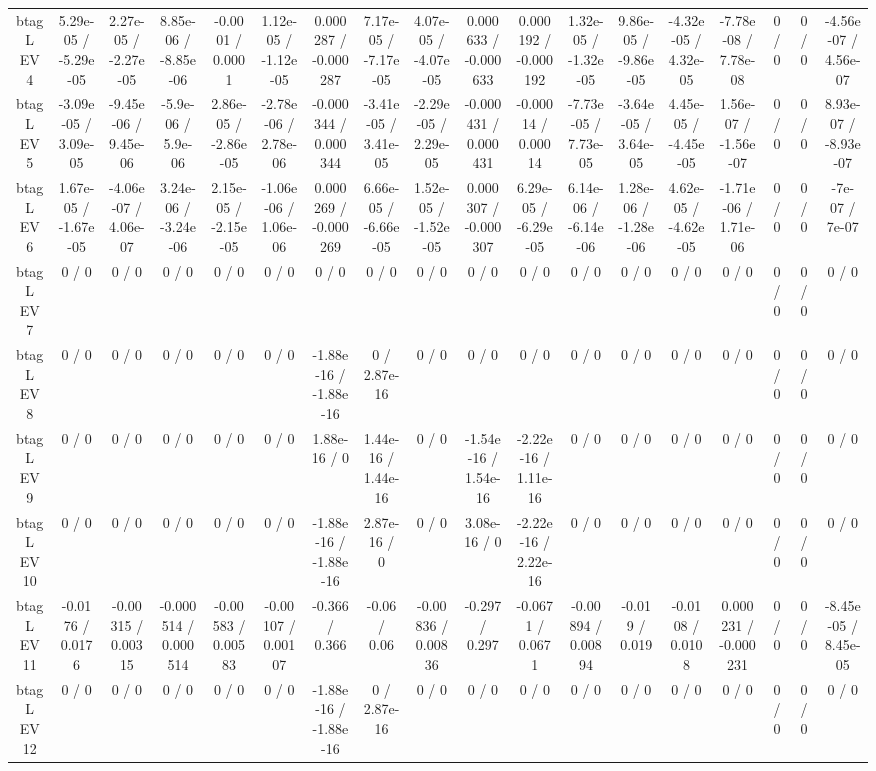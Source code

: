 \documentclass[10pt]{article}
\begin{document}
\begin{table}[htbp]
\begin{center}
\begin{tabular}{|c|c|c|c|c|c|c|c|c|c|c|c|c|c|c|c|c|c|}
  btag L EV 4 & 5.29e-05 / -5.29e-05 & 2.27e-05 / -2.27e-05 & 8.85e-06 / -8.85e-06 & -0.0001 / 0.0001 & 1.12e-05 / -1.12e-05 & 0.000287 / -0.000287 & 7.17e-05 / -7.17e-05 & 4.07e-05 / -4.07e-05 & 0.000633 / -0.000633 & 0.000192 / -0.000192 & 1.32e-05 / -1.32e-05 & 9.86e-05 / -9.86e-05 & -4.32e-05 / 4.32e-05 & -7.78e-08 / 7.78e-08 & 0 / 0 & 0 / 0 & -4.56e-07 / 4.56e-07 \\ 
  btag L EV 5 & -3.09e-05 / 3.09e-05 & -9.45e-06 / 9.45e-06 & -5.9e-06 / 5.9e-06 & 2.86e-05 / -2.86e-05 & -2.78e-06 / 2.78e-06 & -0.000344 / 0.000344 & -3.41e-05 / 3.41e-05 & -2.29e-05 / 2.29e-05 & -0.000431 / 0.000431 & -0.00014 / 0.00014 & -7.73e-05 / 7.73e-05 & -3.64e-05 / 3.64e-05 & 4.45e-05 / -4.45e-05 & 1.56e-07 / -1.56e-07 & 0 / 0 & 0 / 0 & 8.93e-07 / -8.93e-07 \\ 
  btag L EV 6 & 1.67e-05 / -1.67e-05 & -4.06e-07 / 4.06e-07 & 3.24e-06 / -3.24e-06 & 2.15e-05 / -2.15e-05 & -1.06e-06 / 1.06e-06 & 0.000269 / -0.000269 & 6.66e-05 / -6.66e-05 & 1.52e-05 / -1.52e-05 & 0.000307 / -0.000307 & 6.29e-05 / -6.29e-05 & 6.14e-06 / -6.14e-06 & 1.28e-06 / -1.28e-06 & 4.62e-05 / -4.62e-05 & -1.71e-06 / 1.71e-06 & 0 / 0 & 0 / 0 & -7e-07 / 7e-07 \\ 
  btag L EV 7 & 0 / 0 & 0 / 0 & 0 / 0 & 0 / 0 & 0 / 0 & 0 / 0 & 0 / 0 & 0 / 0 & 0 / 0 & 0 / 0 & 0 / 0 & 0 / 0 & 0 / 0 & 0 / 0 & 0 / 0 & 0 / 0 & 0 / 0 \\ 
  btag L EV 8 & 0 / 0 & 0 / 0 & 0 / 0 & 0 / 0 & 0 / 0 & -1.88e-16 / -1.88e-16 & 0 / 2.87e-16 & 0 / 0 & 0 / 0 & 0 / 0 & 0 / 0 & 0 / 0 & 0 / 0 & 0 / 0 & 0 / 0 & 0 / 0 & 0 / 0 \\ 
  btag L EV 9 & 0 / 0 & 0 / 0 & 0 / 0 & 0 / 0 & 0 / 0 & 1.88e-16 / 0 & 1.44e-16 / 1.44e-16 & 0 / 0 & -1.54e-16 / 1.54e-16 & -2.22e-16 / 1.11e-16 & 0 / 0 & 0 / 0 & 0 / 0 & 0 / 0 & 0 / 0 & 0 / 0 & 0 / 0 \\ 
  btag L EV 10 & 0 / 0 & 0 / 0 & 0 / 0 & 0 / 0 & 0 / 0 & -1.88e-16 / -1.88e-16 & 2.87e-16 / 0 & 0 / 0 & 3.08e-16 / 0 & -2.22e-16 / 2.22e-16 & 0 / 0 & 0 / 0 & 0 / 0 & 0 / 0 & 0 / 0 & 0 / 0 & 0 / 0 \\ 
  btag L EV 11 & -0.0176 / 0.0176 & -0.00315 / 0.00315 & -0.000514 / 0.000514 & -0.00583 / 0.00583 & -0.00107 / 0.00107 & -0.366 / 0.366 & -0.06 / 0.06 & -0.00836 / 0.00836 & -0.297 / 0.297 & -0.0671 / 0.0671 & -0.00894 / 0.00894 & -0.019 / 0.019 & -0.0108 / 0.0108 & 0.000231 / -0.000231 & 0 / 0 & 0 / 0 & -8.45e-05 / 8.45e-05 \\ 
  btag L EV 12 & 0 / 0 & 0 / 0 & 0 / 0 & 0 / 0 & 0 / 0 & -1.88e-16 / -1.88e-16 & 0 / 2.87e-16 & 0 / 0 & 0 / 0 & 0 / 0 & 0 / 0 & 0 / 0 & 0 / 0 & 0 / 0 & 0 / 0 & 0 / 0 & 0 / 0 \\ 

\end{tabular}
\end{center}
\end{table}
\end{document}
